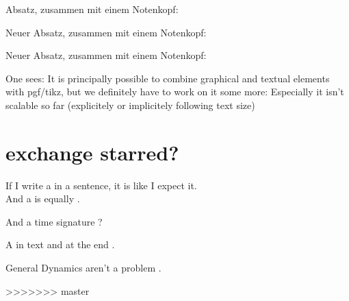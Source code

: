 \documentclass{scrartcl}
\begin{document}
Absatz, zusammen mit einem Notenkopf: 

\Large
Neuer Absatz, zusammen mit einem Notenkopf: 

\normalsize
Neuer Absatz, zusammen mit einem Notenkopf: 

One sees: It is principally possible to combine graphical and textual elements with pgf/tikz,
but we definitely have to work on it some more: Especially it isn't scalable so far (explicitely or implicitely following text size)

\section*{exchange starred?}

If I write a \flat in a sentence, it is like I expect it.\\
And a \lilyRFZ is equally \lilyRF.

And a time signature ?

A \lilyRFZ in text and at the end \lilyRFZ*.

General Dynamics  aren't a problem .


	
>>>>>>> master
\end{document}
